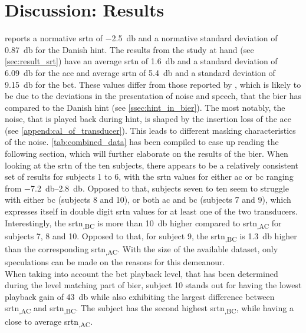 \section{Discussion: Results}\label{sec:disc_res}
\citep{hint_2011} reports a normative \gls{srtn} of \SI{-2.5}{\decibel} and a normative standard deviation of \SI{0.87}{\decibel} for the Danish \gls{hint}. The results from the study at hand (see \autoref{sec:result_srt}) have an average \gls{srtn} of \SI{1.6}{\decibel} and a standard deviation of \SI{6.09}{\decibel} for the \gls{ace} and average \gls{srtn} of \SI{5.4}{\decibel} and a standard deviation of \SI{9.15}{\decibel} for the \gls{bct}.
These values differ from those reported by \citep{hint_2011}, which is likely to be due to the deviations in the presentation of noise and speech, that the \gls{bier} has compared to the Danish \gls{hint} (see \autoref{ssec:hint_in_bier}).
The most notably, the noise, that is played back during \gls{hint}, is shaped by the insertion loss of the \gls{ace} (see \autoref{append:cal_of_transducer}). This leads to different masking characteristics of the noise. 
\autoref{tab:combined_data} has been compiled to ease up reading the following section, which will further elaborate on the results of the \gls{bier}.
When looking at the \gls{srtn} of the ten subjects, there appears to be a relatively consistent set of results for subjects 1 to 6, with the \gls{srtn} values for either \gls{ac} or \gls{bc} ranging from \SIrange{-7.2}{2.8}{\decibel}. 
Opposed to that, subjects seven to ten seem to struggle with either \gls{bc} (subjects 8 and 10), or both \gls{ac} and \gls{bc} (subjects 7 and 9), which expresses itself in double digit \gls{srtn} values for at least one of the two transducers. 
Interestingly, the \gls{srtn}\textsubscript{,BC} is more than \SI{10}{\decibel} higher compared to \gls{srtn}\textsubscript{,AC} for subjects 7, 8 and 10. Opposed to that, for subject 9, the \gls{srtn}\textsubscript{,BC} is \SI{1.3}{\decibel} higher than the corresponding \gls{srtn}\textsubscript{,AC}.
With the size of the available dataset, only speculations can be made on the reasons for this demeanour.\\
When taking into account the \gls{bct} playback level, that has been determined during the level matching part of \gls{bier}, subject 10 stands out for having the lowest playback gain of \SI{43}{\decibel} while also exhibiting the largest difference between \gls{srtn}\textsubscript{,AC} and \gls{srtn}\textsubscript{,BC}. 
The subject has the second highest \gls{srtn}\textsubscript{,BC}, while having a close to average \gls{srtn}\textsubscript{,AC}.
